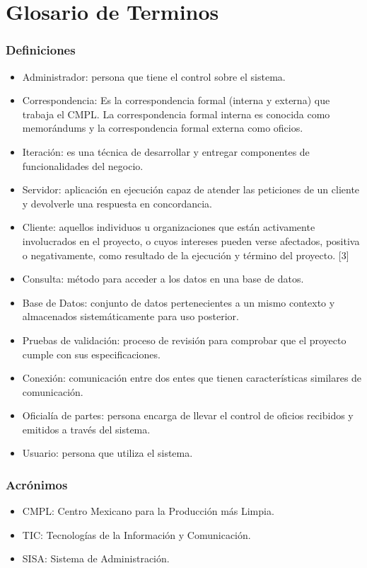 \section{Glosario de Terminos}

\subsubsection{Definiciones}

\begin{itemize}
	\item Administrador: persona que tiene el control sobre el sistema.
	\item Correspondencia: Es la correspondencia formal (interna y externa) que trabaja el CMPL. La correspondencia formal interna es conocida como memorándums y la correspondencia formal externa como oficios.
	\item Iteración: es una técnica de desarrollar y entregar componentes de funcionalidades del negocio.
	\item Servidor: aplicación en ejecución capaz de atender las peticiones de un cliente y devolverle una respuesta en concordancia.
	\item Cliente: aquellos individuos u organizaciones que están activamente involucrados en el proyecto, o cuyos intereses pueden verse afectados, positiva o negativamente, como resultado de la ejecución y término del proyecto. [3]
	\item Consulta: método para acceder a los datos en una base de datos.
	\item Base de Datos: conjunto de datos pertenecientes a un mismo contexto y almacenados sistemáticamente para uso posterior.
	\item Pruebas de validación: proceso de revisión para comprobar que el proyecto cumple con sus especificaciones.
	\item Conexión: comunicación entre dos entes que tienen características similares de comunicación.
	\item Oficialía de partes: persona encarga de llevar el control de oficios recibidos y emitidos a través del sistema.
	\item Usuario: persona que utiliza el sistema.
\end{itemize}

\subsubsection{Acrónimos}

\begin{itemize}
	\item CMPL: Centro Mexicano para la Producción más Limpia.
	\item TIC: Tecnologías de la Información y Comunicación.
	\item SISA: Sistema de Administración.
\end{itemize}

